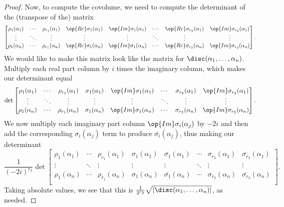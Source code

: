 \documentclass[../notes.tex]{subfiles}
\begin{document}
\begin{proof}
	Now, to compute the covolume, we need to compute the determinant of the (transpose of the) matrix
	\[\begin{bmatrix}
		\rho_1(\alpha_1) & \cdots & \rho_{r_1}(\alpha_1) & \op{Re}\sigma_1(\alpha_1) & \op{Im}\sigma_1(\alpha_1) & \cdots & \op{Re}\sigma_{r_2}(\alpha_1) & \op{Im}\sigma_{r_2}(\alpha_1) \\
		\vdots & \ddots & \vdots & \vdots & \vdots & \ddots & \vdots & \vdots \\
		\rho_1(\alpha_n) & \cdots & \rho_{r_1}(\alpha_n) & \op{Re}\sigma_1(\alpha_n) & \op{Im}\sigma_1(\alpha_n) & \cdots & \op{Re}\sigma_{r_2}(\alpha_n) & \op{Im}\sigma_{r_2}(\alpha_n) \\
	\end{bmatrix}.\]
	We would like to make this matrix look like the matrix for $\disc(\alpha_1,\ldots,\alpha_n)$. Multiply each real part column by $i$ times the imaginary column, which makes our determinant equal
	\[\det\begin{bmatrix}
		\rho_1(\alpha_1) & \cdots & \rho_{r_1}(\alpha_1) & \sigma_1(\alpha_1) & \op{Im}\sigma_1(\alpha_1) & \cdots & \sigma_{r_2}(\alpha_1) & \op{Im}\sigma_{r_2}(\alpha_1) \\
		\vdots & \ddots & \vdots & \vdots & \vdots & \ddots & \vdots & \vdots \\
		\rho_1(\alpha_n) & \cdots & \rho_{r_1}(\alpha_n) & \sigma_1(\alpha_n) & \op{Im}\sigma_1(\alpha_n) & \cdots & \sigma_{r_2}(\alpha_n) & \op{Im}\sigma_{r_2}(\alpha_n) \\
	\end{bmatrix}.\]
	We now multiply each imaginary part column $\op{Im}\sigma_i(\alpha_j)$ by $-2i$ and then add the corresponding $\sigma_i(\alpha_j)$ term to produce $\overline{\sigma_i}(\alpha_j)$, thus making our determinant
	\[\frac1{(-2i)^{r_2}}\det\begin{bmatrix}
		\rho_1(\alpha_1) & \cdots & \rho_{r_1}(\alpha_1) & \sigma_1(\alpha_1) & \overline{\sigma_1}(\alpha_1) & \cdots & \sigma_{r_2}(\alpha_1) & \overline{\sigma_{r_2}}(\alpha_1) \\
		\vdots & \ddots & \vdots & \vdots & \vdots & \ddots & \vdots & \vdots \\
		\rho_1(\alpha_n) & \cdots & \rho_{r_1}(\alpha_n) & \sigma_1(\alpha_n) & \overline{\sigma_1}(\alpha_n) & \cdots & \sigma_{r_2}(\alpha_n) & \overline{\sigma_{r_2}}(\alpha_n) \\
	\end{bmatrix}.\]
	Taking absolute values, we see that this is $\frac1{2^{r_2}}\sqrt{\left|\disc(\alpha_1,\ldots,\alpha_n)\right|}$, as needed.
\end{proof}
\end{document}
